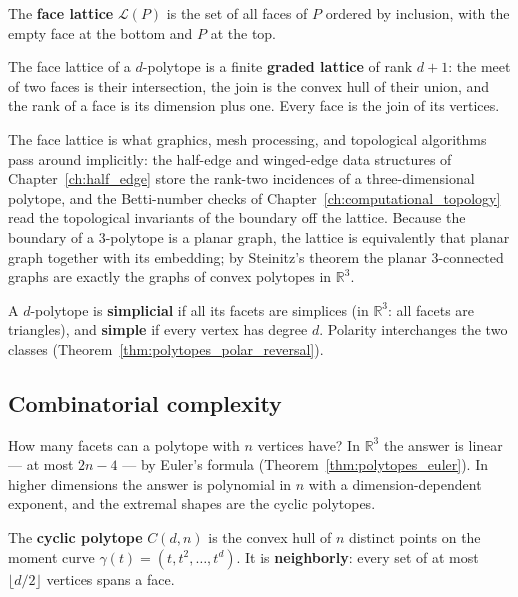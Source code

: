 \begin{definition}\label{def:polytopes_face_lattice}
  The \textbf{face lattice} $\mathcal{L}(P)$ is the set of all faces of $P$
  ordered by inclusion, with the empty face at the bottom and $P$ at the
  top.
\end{definition}

\begin{theorem}\label{thm:polytopes_face_lattice}
  The face lattice of a $d$-polytope is a finite \textbf{graded lattice} of
  rank $d+1$: the meet of two faces is their intersection, the join is the
  convex hull of their union, and the rank of a face is its dimension plus
  one. Every face is the join of its vertices.
\end{theorem}

The face lattice is what graphics, mesh processing, and topological
algorithms pass around implicitly: the half-edge and winged-edge data
structures of Chapter~\ref{ch:half_edge} store the rank-two incidences of a
three-dimensional polytope, and the Betti-number checks of
Chapter~\ref{ch:computational_topology} read the topological invariants of
the boundary off the lattice. Because the boundary of a $3$-polytope is a
planar graph, the lattice is equivalently that planar graph together with
its embedding; by Steinitz's theorem the planar 3-connected graphs are
exactly the graphs of convex polytopes in $\mathbb{R}^3$.

\begin{definition}\label{def:polytopes_simple_simplicial}
  A $d$-polytope is \textbf{simplicial} if all its facets are simplices (in
  $\mathbb{R}^3$: all facets are triangles), and \textbf{simple} if every
  vertex has degree $d$. Polarity interchanges the two classes
  (Theorem~\ref{thm:polytopes_polar_reversal}).
\end{definition}

\subsection{Combinatorial complexity}

How many facets can a polytope with $n$ vertices have? In
$\mathbb{R}^3$ the answer is linear --- at most $2n - 4$ --- by Euler's
formula (Theorem~\ref{thm:polytopes_euler}). In higher dimensions the answer
is polynomial in $n$ with a dimension-dependent exponent, and the extremal
shapes are the cyclic polytopes.

\begin{definition}\label{def:polytopes_cyclic}
  The \textbf{cyclic polytope} $C(d,n)$ is the convex hull of $n$ distinct
  points on the moment curve $\gamma(t) = (t, t^2, \dots, t^d)$. It is
  \textbf{neighborly}: every set of at most $\lfloor d/2 \rfloor$ vertices
  spans a face.
\end{definition}

